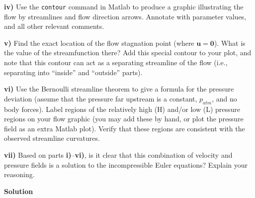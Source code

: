 \documentclass{article}
\def\*#1{\mathbf{#1}}
\begin{document}
\textbf{iv)} Use the \texttt{contour} command in Matlab to produce a
graphic illustrating the flow by streamlines and flow direction arrows.
Annotate with parameter values, and all other relevant comments.

\textbf{v)} Find the exact location of the flow stagnation point (where
$\*u = \*0$). What is the value of the streamfunction there? Add this
special contour to your plot, and note that this contour can act as a
separating streamline of the flow (i.e., separating into ``inside'' and
``outside'' parts).

\textbf{vi)} Use the Bernoulli streamline theorem to give a formula for
the pressure deviation (assume that the pressure far upstream is a
constant, $p_{atm}$, and no body forces). Label regions of the
relatively high (H) and/or low (L) pressure regions on your flow graphic
(you may add these by hand, or plot the pressure field as an extra
Matlab plot). Verify that these regions are consistent with the observed
streamline curvatures.

\textbf{vii)} Based on parts \textbf{i)}--\textbf{vi)}, is it clear that
this combination of velocity and pressure fields is a solution to the
incompressible Euler equations? Explain your reasoning.

\newpage

\textbf{Solution}
\end{document}
